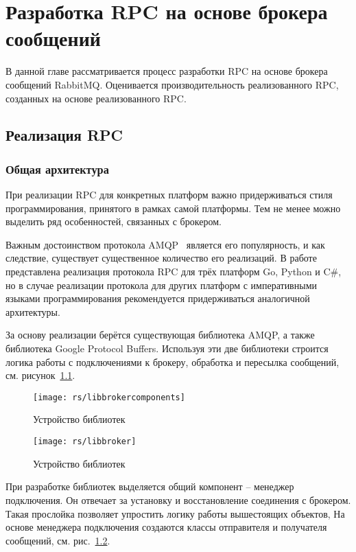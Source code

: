 \chapter{Разработка RPC на основе брокера сообщений}
В данной главе рассматривается процесс разработки RPC на основе
брокера сообщений RabbitMQ. Оценивается производительность реализованного RPC,
созданных на основе реализованного RPC.

\section{Реализация RPC}

\subsection{Общая архитектура}
При реализации RPC для конкретных платформ важно придерживаться стиля
программирования, принятого в рамках самой платформы. Тем не менее
можно выделить ряд особенностей, связанных с брокером.

Важным достоинством протокола AMQP~\cite{amqp} является его популярность,
и как следствие, существует существенное количество его реализаций.
В работе представлена реализация протокола RPC для трёх платформ Go, Python
и C\#, но в случае реализации протокола для других платформ с императивными
языками программирования рекомендуется придерживаться аналогичной архитектуры.

За основу реализации берётся существующая библиотека AMQP, а также библиотека
Google Protocol Buffers. Используя эти две библиотеки строится логика работы
с подключениями к брокеру, обработка и пересылка сообщений,
см. рисунок~\ref{fig:libbrokercomponents}.

\begin{figure}[H]
    \centering
    \texttt{[image: rs/libbrokercomponents]}
    \caption{Устройство библиотек}
    \label{fig:libbrokercomponents}
\end{figure}

\begin{figure}[H]
    \centering
    \texttt{[image: rs/libbroker]}
    \caption{Устройство библиотек}
    \label{fig:libbroker}
\end{figure}

При разработке библиотек выделяется общий компонент -- менеджер подключения.
Он отвечает за установку и восстановление соединения с брокером.
Такая прослойка позволяет упростить логику работы вышестоящих объектов,
На основе менеджера подключения создаются классы отправителя и получателя
сообщений, см. рис.~\ref{fig:libbroker}.

